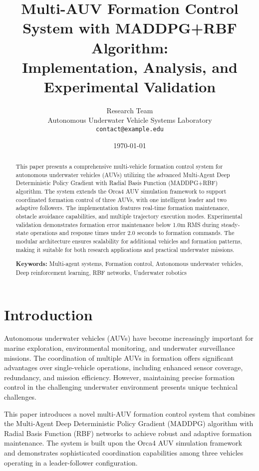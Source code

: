 \documentclass[11pt,a4paper]{article}
\title{\textbf{Multi-AUV Formation Control System with MADDPG+RBF Algorithm: \\ Implementation, Analysis, and Experimental Validation}}
\author{
    Research Team\\
    Autonomous Underwater Vehicle Systems Laboratory\\
    \texttt{contact@example.edu}
}
\date{\today}
\begin{document}
\maketitle

\begin{abstract}
This paper presents a comprehensive multi-vehicle formation control system for autonomous underwater vehicles (AUVs) utilizing the advanced Multi-Agent Deep Deterministic Policy Gradient with Radial Basis Function (MADDPG+RBF) algorithm. The system extends the Orca4 AUV simulation framework to support coordinated formation control of three AUVs, with one intelligent leader and two adaptive followers. The implementation features real-time formation maintenance, obstacle avoidance capabilities, and multiple trajectory execution modes. Experimental validation demonstrates formation error maintenance below 1.0m RMS during steady-state operations and response times under 2.0 seconds to formation commands. The modular architecture ensures scalability for additional vehicles and formation patterns, making it suitable for both research applications and practical underwater missions.

\textbf{Keywords:} Multi-agent systems, Formation control, Autonomous underwater vehicles, Deep reinforcement learning, RBF networks, Underwater robotics
\end{abstract}

\tableofcontents
\newpage

\section{Introduction}

Autonomous underwater vehicles (AUVs) have become increasingly important for marine exploration, environmental monitoring, and underwater surveillance missions. The coordination of multiple AUVs in formation offers significant advantages over single-vehicle operations, including enhanced sensor coverage, redundancy, and mission efficiency. However, maintaining precise formation control in the challenging underwater environment presents unique technical challenges.

This paper introduces a novel multi-AUV formation control system that combines the Multi-Agent Deep Deterministic Policy Gradient (MADDPG) algorithm with Radial Basis Function (RBF) networks to achieve robust and adaptive formation maintenance. The system is built upon the Orca4 AUV simulation framework and demonstrates sophisticated coordination capabilities among three vehicles operating in a leader-follower configuration.
\end{document}
